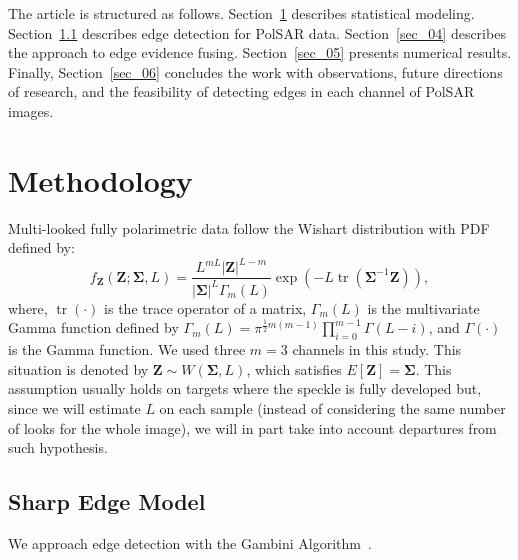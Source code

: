 \documentclass[journal]{IEEEtran}
\DeclareMathOperator{\traco}{tr}
\begin{document}


The article is structured as follows.
Section~\ref{sec_02} describes statistical modeling.
Section~\ref{sec_03} describes edge detection for PolSAR data.
Section~\ref{sec_04} describes the approach to edge evidence fusing.
Section~\ref{sec_05} presents numerical results.
Finally, Section~\ref{sec_06} concludes the work with observations, future directions of research, and the feasibility of detecting edges in each channel of PolSAR images.

\section{Methodology}\label{sec_02}

Multi-looked fully polarimetric data follow the Wishart distribution with PDF defined by:
\begin{equation}
    f_{\mathbf{Z}}(\mathbf{Z};\mathbf{\Sigma},L)=\frac{L^{mL}|\mathbf{Z}|^{L-m}}{|\mathbf{\Sigma}|^{L}\Gamma_m(L)} \exp(-L\traco(\mathbf{\Sigma}^{-1}\mathbf{Z})),
    \label{eq:DistWishart}
\end{equation} 
where, $\traco(\cdot)$ is the trace operator of a matrix, $\Gamma_m(L)$ is the multivariate Gamma function defined by $
	\Gamma_m(L)=\pi^{\frac{1}{2}m(m-1)} \prod_{i=0}^{m-1}\Gamma(L-i)$,
and $\Gamma(\cdot)$ is the Gamma function.
We used three $m=3$ channels in this study. 
This situation is denoted by $\mathbf{Z}\sim W(\mathbf{\Sigma}, L)$, which satisfies $E[\mathbf{Z}]=\mathbf{\Sigma}$. 
This assumption usually holds on targets where the speckle is fully developed but, since we will estimate $L$ on each sample (instead of considering the same number of looks for the whole image), we will in part take into account departures from such hypothesis.

\subsection{Sharp Edge Model}\label{sec_03}
We approach edge detection with the Gambini Algorithm~\cite{gmbf, fbgm, nhfc}.
\end{document}
